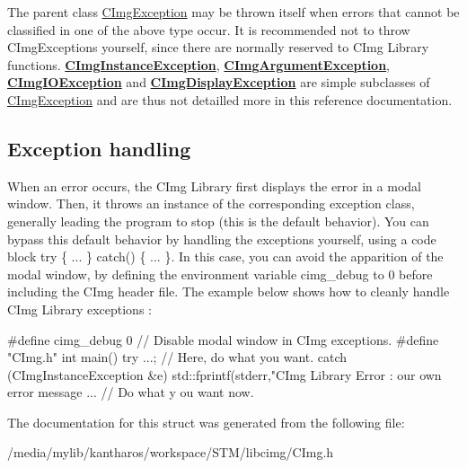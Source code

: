 The parent class \hyperlink{structcimg__library_1_1_c_img_exception}{CImgException} may be thrown itself when errors that cannot be classified in one of the above type occur. It is recommended not to throw CImgExceptions yourself, since there are normally reserved to CImg Library functions. {\bfseries \hyperlink{structcimg__library_1_1_c_img_instance_exception}{CImgInstanceException}}, {\bfseries \hyperlink{structcimg__library_1_1_c_img_argument_exception}{CImgArgumentException}}, {\bfseries \hyperlink{structcimg__library_1_1_c_img_i_o_exception}{CImgIOException}} and {\bfseries \hyperlink{structcimg__library_1_1_c_img_display_exception}{CImgDisplayException}} are simple subclasses of \hyperlink{structcimg__library_1_1_c_img_exception}{CImgException} and are thus not detailled more in this reference documentation.\hypertarget{structcimg__library_1_1_c_img_exception_ex2}{}\subsection{Exception handling}\label{structcimg__library_1_1_c_img_exception_ex2}
When an error occurs, the CImg Library first displays the error in a modal window. Then, it throws an instance of the corresponding exception class, generally leading the program to stop (this is the default behavior). You can bypass this default behavior by handling the exceptions yourself, using a code block {\ttfamily try \{ ... \} catch() \{ ... \}}. In this case, you can avoid the apparition of the modal window, by defining the environment variable {\ttfamily cimg\_\-debug} to 0 before including the CImg header file. The example below shows how to cleanly handle CImg Library exceptions : 
\begin{DoxyCode}
      #define cimg_debug 0     // Disable modal window in CImg exceptions.
      #define "CImg.h"
      int main() {
        try {
          ...; // Here, do what you want.
        }
        catch (CImgInstanceException &e) {
          std::fprintf(stderr,"CImg Library Error : %
      our own error message
          ...                                                        // Do what y
      ou want now.
        }
      }
\end{DoxyCode}
 

The documentation for this struct was generated from the following file:\begin{DoxyCompactItemize}
\item 
/media/mylib/kantharos/workspace/STM/libcimg/CImg.h\end{DoxyCompactItemize}
